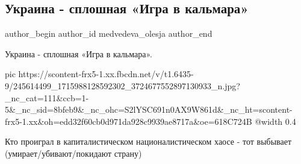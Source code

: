  
 
 
 
 
 
\subsection{Украина - сплошная «Игра в кальмара»}
\label{sec:13_10_2021.fb.medvedeva_olesja.1.igra_v_kalmara_ukraina}
 
\ifcmt
 author_begin
   author_id medvedeva_olesja
 author_end
\fi

Украина - сплошная «Игра в кальмара».

\ifcmt
  pic https://scontent-frx5-1.xx.fbcdn.net/v/t1.6435-9/245614499_1715988128592302_3724677552897130933_n.jpg?_nc_cat=111&ccb=1-5&_nc_sid=8bfeb9&_nc_ohc=S2lYSC691n0AX9W861d&_nc_ht=scontent-frx5-1.xx&oh=edd32f60cb0d971da928c9939ae8717a&oe=618C724B
  @width 0.4
\fi

Кто проиграл в капиталистическом националистическом хаосе - тот выбывает
(умирает/убивают/покидают страну)

